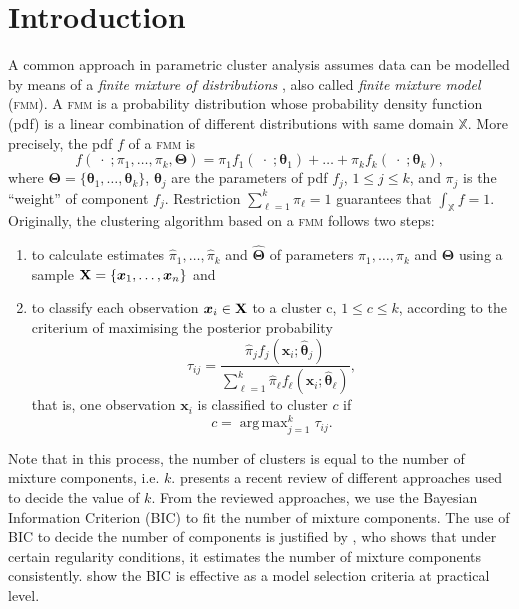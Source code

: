 \documentclass[submit]{smj}
\DeclareMathOperator*{\argmax}{arg\,max}
\theoremstyle{definition}
\newcommand{\m}[1]{\boldsymbol{#1}}
\newcommand{\fmm}{\textsc{fmm}\xspace}
\newcommand{\X}{\text{\textbf{X}}}
\begin{document}



\maketitle

\section{Introduction}


A common approach in parametric cluster analysis assumes data can be modelled by means of a \emph{finite mixture of distributions} \citep{fraley2002model, punzo2014flexible}, also called \emph{finite mixture model} (\fmm). A \fmm is a probability distribution whose probability density function (pdf) is a linear combination of different distributions with same domain $\mathbb{X}$. More precisely, the pdf $f$ of a \fmm is
\begin{equation}\label{mixt}
f(\;\cdot\; ; \pi_1, \dots, \pi_k, \m\Theta) = \pi_1 f_1(\;\cdot\; ; \m\theta_1) + \dots + \pi_k f_k(\;\cdot\; ; \m\theta_k),
\end{equation}
where $\m\Theta =\{ \m\theta_1, \dots, \m\theta_k\}$, $\m\theta_j$ are the parameters of pdf $f_j$, $1\leq j \leq k$, and $\pi_j$ is the ``weight'' of component $f_j$. Restriction $\sum_{\ell = 1}^k \pi_\ell = 1$ guarantees that  $\int_{\mathbb{X}}f = 1$. Originally, the clustering algorithm based on a \fmm follows two steps:
\begin{enumerate}
\item to calculate estimates $\hat{\pi}_1, \dots, \hat{\pi}_k$ and $\hat{\m\Theta}$ of parameters $\pi_1, \dots, \pi_k$ and $\m\Theta$ using a sample $\X=\{\m x_1, \dots, \m x_n\}$ and
\item to classify each observation $\m x_i \in \X$ to a cluster c, $1\leq c \leq k$, according to the criterium of maximising the posterior probability
\[
\tau_{ij}= \frac{ \hat{\pi}_j f_j(\m x_i ; \hat{\m\theta}_j) }{\sum_{\ell=1}^k \hat{\pi}_\ell f_\ell(\m x_i ; \hat{\m\theta}_\ell) },
\]
that is, one observation $\m x_i$ is classified to cluster $c$ if
\begin{equation}\label{map_criteria}
c = \argmax_{j=1}^k \tau_{ij}.
\end{equation}
\end{enumerate}
Note that in this process, the number of clusters is equal to the number of mixture components, i.e.  $k$. \cite{mclachlan2014components} presents a recent review of different approaches used to decide the value of $k$. From the reviewed approaches, we use the Bayesian Information Criterion (BIC) to fit the number of mixture components. The use of BIC to decide the number of components is justified by \cite{keribin1998consistent, keribin2000consistent}, who shows that under certain regularity conditions, it estimates the number of mixture components consistently. \cite{fraley1998how} show the BIC is effective as a model selection criteria  at practical level.
\end{document}
